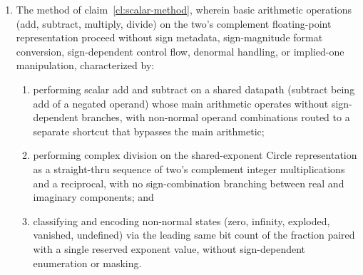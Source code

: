 \documentclass[12pt,letter]{article}
\begin{document}
\begin{enumerate}
    \item The method of claim~\ref{cl:scalar-method}, wherein basic arithmetic operations (add, subtract, multiply, divide) on the two's complement floating-point representation proceed without sign metadata, sign-magnitude format conversion, sign-dependent control flow, denormal handling, or implied-one manipulation, characterized by:
          \begin{enumerate}
              \item performing scalar add and subtract on a shared datapath (subtract being add of a negated operand) whose main arithmetic operates without sign-dependent branches, with non-normal operand combinations routed to a separate shortcut that bypasses the main arithmetic;
              \item performing complex division on the shared-exponent Circle representation as a straight-thru sequence of two's complement integer multiplications and a reciprocal, with no sign-combination branching between real and imaginary components; and
              \item classifying and encoding non-normal states (zero, infinity, exploded, vanished, undefined) via the leading same bit count of the fraction paired with a single reserved exponent value, without sign-dependent enumeration or masking.
          \end{enumerate}


\end{enumerate}
\end{document}
